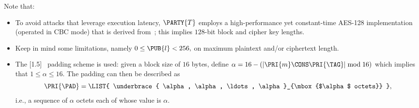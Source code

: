 


%
Note that:

\begin{itemize}
\item To avoid attacks that leverage execution latency, 
      $\PARTY{T}$ 
      employs a high-performance yet constant-time AES-128 implementation 
      (operated in CBC mode) that is derived from~\cite{SCALE:KasSch:09};
      this implies $128$-bit block and cipher key lengths.  
\item Keep in mind some limitations, namely 
      $
      0 \leq \PUB{l} < 256 ,
      $
      on maximum plaintext and/or ciphertext length.
\item The [1.5]~\cite[Section 10.3]{SCALE:RFC:2315} padding scheme 
      is used: given a block size of $16$ bytes, define
      $
      \alpha = 16 - ( | \PRI{m} \CONS \PRI{\TAG} | \bmod 16 ) 
      $
      which implies that
      $
      1 \leq \alpha \leq 16 .
      $
      The padding can then be described as
      \[
      \PRI{\PAD} = \LIST{ \underbrace{ \alpha, \alpha, \ldots, \alpha }_{\mbox{$\alpha$ octets}} } ,
      \]
      i.e., a sequence of $\alpha$ octets each of whose value is $\alpha$.
\end{itemize}


